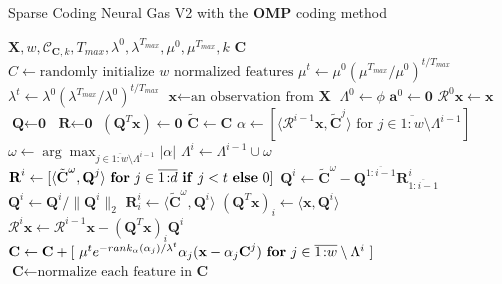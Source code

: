 \documentclass[12pt,a4paper,oneside,english]{UPBThesis}
\newcommand{\hcrange}[2]{\overline{{#1}\colon\!\!{#2}}}
\begin{document}
\begin{algorithm}
\caption{Sparse Coding Neural Gas V2 with the \textbf{OMP} coding method}
\label{algo:SparseCodingNeuralGasV2OMP}
\begin{algorithmic}
\Require $\textbf{X},w,\mathcal{C}_{\textbf{C},k},T_{max},\lambda^0,\lambda^{T_{max}},\mu^0,\mu^{T_{max}},k$
\Ensure $\textbf{C}$
\State $C \gets \mbox{randomly initialize $w$ normalized features}$
\For {$t = \hcrange{1}{T_{max}}$}
\State $\mu^t \gets \mu^0 (\mu^{T_{max}} / \mu^0)^{t / T_{max}}$  
\State $\lambda^t \gets \lambda^0 (\lambda^{T_{max}} / \lambda^0)^{t / T_{max}}$ 
\State $\textbf{x} \gets \text{an observation from $\textbf{X}$}$
\State $\Lambda^0 \gets \phi$
\State $\textbf{a}^0 \gets \textbf{0}$
\State $\mathcal{R}^0\textbf{x} \gets \textbf{x}$
\State $\textbf{Q} \gets \textbf{0}$
\State $\textbf{R} \gets \textbf{0}$
\State $(\textbf{Q}^T\textbf{x}) \gets \textbf{0}$
\State $\tilde{\textbf{C}} \gets \textbf{C}$
\For {$i = \hcrange{0}{k}$}
\State $\alpha \gets [ \langle \mathcal{R}^{i-1}\textbf{x} , \tilde{\textbf{C}}^j \rangle \mbox{~for $j \in \hcrange{1}{w} \setminus \Lambda^{i-1}$} ]$
\State $\omega \gets \arg \max_{j \in \hcrange{1}{w} \setminus \Lambda^{i-1}} \left| \alpha \right|$
\State $\Lambda^i \gets \Lambda^{i-1} \cup \omega$
\State $\textbf{R}^i \gets [ \langle \tilde{\textbf{C}}^\omega, \textbf{Q}^j \rangle~\mbox{\textbf{for} $j \in \hcrange{1}{d}$ \textbf{if} $j < t$ \textbf{else} $0$} ]$ 
\State $\textbf{Q}^i \gets \tilde{\textbf{C}}^\omega - \textbf{Q}^{\hcrange{1}{i-1}}\textbf{R}^i_{\hcrange{1}{i-1}}$ 
\State $\textbf{Q}^i \gets \textbf{Q}^i / \| \textbf{Q}^i \|_2$ 
\State $\textbf{R}^i_i \gets \langle \tilde{\textbf{C}}^\omega, \textbf{Q}^i \rangle$
\State $(\textbf{Q}^T\textbf{x})_i \gets \langle \textbf{x}, \textbf{Q}^i \rangle$
\State $\mathcal{R}^i\textbf{x} \gets \mathcal{R}^{i-1}\textbf{x} -  (\textbf{Q}^T\textbf{x})_i \textbf{Q}^i$
\State $\textbf{C} \gets \textbf{C} + [ ~ \mu^t e^{-rank_{\alpha}(\alpha_j) / \lambda^t} \alpha_j (\textbf{x} - \alpha_j \textbf{C}^j) ~ \mbox{\textbf{for} $j \in \hcrange{1}{w}\setminus\Lambda^i$} ~ ]$
\State $\textbf{C} \gets \mbox{normalize each feature in $\textbf{C}$}$
\EndFor
\EndFor
\end{algorithmic}
\end{algorithm}
\end{document}
